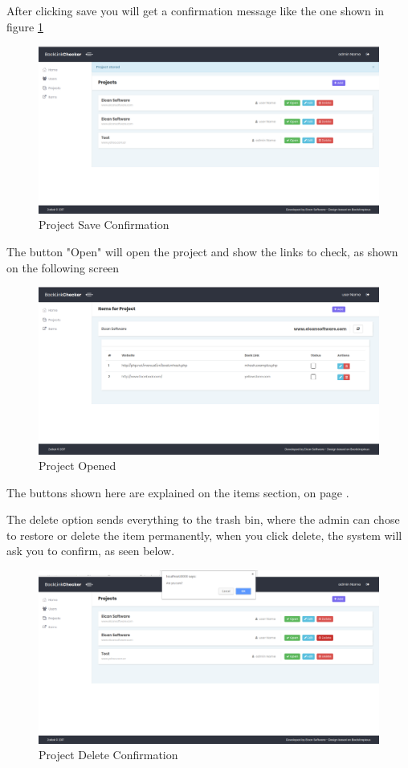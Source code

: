 After clicking save you will get a confirmation message like the one shown in figure \ref{img:confirm}
\begin{figure}[H]
	\caption{Project Save Confirmation}
	\label{img:confirm}
	\includegraphics[width=\textwidth]{images/project_stored}
\end{figure}

The button "Open" will open the project and show the links to check, as shown on the following screen
\begin{figure}[H]
	\caption{Project Opened}
	\label{img:prjopened}
	\includegraphics[width=\textwidth]{images/items_for_project}
\end{figure}
The buttons shown here are explained on the items section, on page \pageref{sec:item}.

The delete option sends everything to the trash bin, where the admin can chose to restore or delete the item permanently, when you click delete, the system will ask you to confirm, as seen below.
\begin{figure}[H]
	\caption{Project Delete Confirmation}
	\label{img:prjdel}
	\includegraphics[width=\textwidth]{images/project_delete}
\end{figure}

